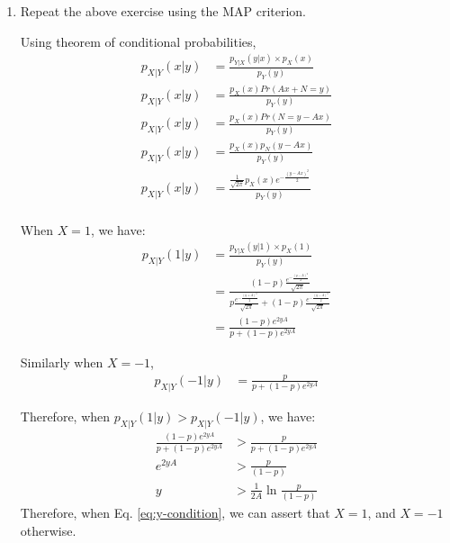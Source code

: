 \documentclass[journal,12pt,twocolumn]{IEEEtran}
\renewcommand\thesection{\arabic{section}}
\begin{document}
\begin{enumerate}[label=\thesection.\arabic*
,ref=\thesection.\theenumi]
\solution

\begin{align}
    P_e &= P_{e|0} p+ P_{e|1} (1-p) \\
    &= p Q_N(A - \delta) + (1-p)Q_N(A + \delta)
\intertext{Differentiating as before, we get:}
0 &= p \frac{1}{\sqrt{2\pi}} e^{-\frac{(\delta - A)^2}{2}} - (1-p)\frac{1}{\sqrt{2\pi}} e^{-\frac{(A + \delta)^2}{2}} 
\end{align}
 Taking $\ln$ on both sides we have:
 \begin{align}
    \ln{p} - \frac{(\delta - A)^2}{2} &= \ln{1-p} - \frac{(\delta + A)^2}{2} \\
	\implies 2\delta A &= \ln{\frac{1-p}{p}} \\
    \implies \delta &= \frac{1}{2A} \ln{\frac{1-p}{p}}
 \end{align}
\item Repeat the above exercise using the MAP criterion.

\solution

Using theorem of conditional probabilities,
\begin{align}
    p_{X|Y}(x|y) &= \frac{p_{Y|X}(y|x) \times p_X(x)}{p_Y(y)} \\
	p_{X|Y}(x|y) &= \frac{p_X(x)Pr(Ax + N = y)}{p_Y(y)} \\
	p_{X|Y}(x|y) &= \frac{p_X(x)Pr(N = y - Ax)}{p_Y(y)} \\
	p_{X|Y}(x|y) &= \frac{p_X(x)p_N(y - Ax)}{p_Y(y)} \\
	p_{X|Y}(x|y) &= \frac{\frac{1}{\sqrt{2\pi}}p_X(x)e^{-\frac{(y-Ax)^2}{2}}}{p_Y(y)} \\
\end{align}

When $X=1$, we have:
\begin{align}
    p_{X|Y}(1|y) &= \frac{p_{Y|X}(y|1) \times p_X(1)}{p_Y(y)} \\
    &= \frac{\left(1-p\right) \frac{e^{-\frac{(y-A)^2}{2}}}{\sqrt{2\pi}}}{ p \frac{e^{-\frac{(y+A)^2}{2}}}{\sqrt{2\pi}} + \left(1-p\right) \frac{e^{-\frac{(y-A)^2}{2}}}{\sqrt{2\pi}}} \\
    &= \frac{\left(1-p\right) e^{2yA}}{p + \left(1-p\right) e^{2yA}}
\end{align}

Similarly when $X=-1$,
\begin{align}
	p_{X|Y}(-1|y) &= \frac{p}{p + (1-p)e^{2yA}}
\end{align}

Therefore, when $ p_{X|Y}(1|y) >  p_{X|Y}(-1|y)$, we have:
\begin{align}
    \frac{\left(1-p\right) e^{2yA}}{p + \left(1-p\right) e^{2yA}} &> \frac{p}{p + \left(1-p\right) e^{2yA}} \\
    e^{2yA} &> \frac{p}{\left(1-p\right)} \\
    \label{eq:y-condition}
    y &> \frac{1}{2A} \ln{\frac{p}{\left(1-p\right)}}
\end{align}
Therefore, when Eq. \eqref{eq:y-condition}, we can assert that $X = 1$, and $X = -1$ otherwise.
\end{enumerate}
%
%
\end{document}
